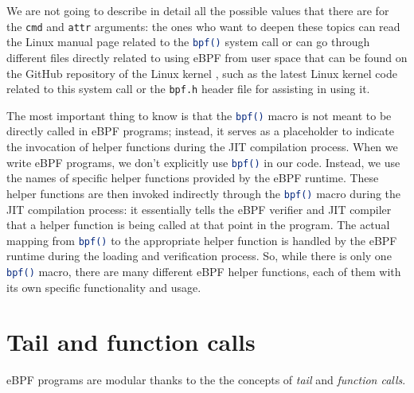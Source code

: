 We are not going to describe in detail all the possible values that there are for the \colorbox{backcolour}{\lstinline[style=commandline, language=bash, breaklines=true]|cmd|} and \colorbox{backcolour}{\lstinline[style=commandline, language=bash, breaklines=true]|attr|} arguments: the ones who want to deepen these topics can read the Linux manual page related to the \colorbox{backcolour}{\lstinline[style=commandline, language=bash, breaklines=true]|bpf()|} system call \cite{BPFManPage} or can go through different files directly related to using eBPF from user space that can be found on the GitHub repository of the Linux kernel \cite{LinuxKernelRepo}, such as the latest Linux kernel code related to this system call \cite{BPFKernelCode} or the \colorbox{backcolour}{\lstinline[style=commandline, language=bash, breaklines=true]|bpf.h|} header file \cite{BPFHeader} for assisting in using it.

The most important thing to know is that the \colorbox{backcolour}{\lstinline[style=commandline, language=bash, breaklines=true]|bpf()|} macro is not meant to be directly called in eBPF programs; instead, it serves as a placeholder to indicate the invocation of helper functions during the JIT compilation process.
When we write eBPF programs, we don't explicitly use \colorbox{backcolour}{\lstinline[style=commandline, language=bash, breaklines=true]|bpf()|} in our code. 
Instead, we use the names of specific helper functions provided by the eBPF runtime.
These helper functions are then invoked indirectly through the \colorbox{backcolour}{\lstinline[style=commandline, language=bash, breaklines=true]|bpf()|} macro during the JIT compilation process: it essentially tells the eBPF verifier and JIT compiler that a helper function is being called at that point in the program. 
The actual mapping from \colorbox{backcolour}{\lstinline[style=commandline, language=bash, breaklines=true]|bpf()|} to the appropriate helper function is handled by the eBPF runtime during the loading and verification process.
So, while there is only one \colorbox{backcolour}{\lstinline[style=commandline, language=bash, breaklines=true]|bpf()|} macro, there are many different eBPF helper functions, each of them with its own specific functionality and usage.

\section{Tail and function calls}

eBPF programs are modular thanks to the the concepts of \textit{tail} and \textit{function calls}.
 
